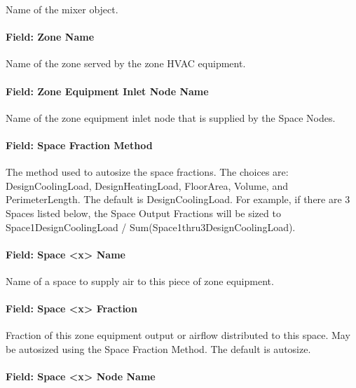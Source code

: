 Name of the mixer object.

\paragraph{Field: Zone Name}\label{field-seqmixer-zone-name}

Name of the zone served by the zone HVAC equipment.

\paragraph{Field: Zone Equipment Inlet Node Name}\label{field-seqmixer-zone-equipment-inlet-node-name}

Name of the zone equipment inlet node that is supplied by the Space Nodes.

\paragraph{Field: Space Fraction Method}\label{field-seqmixer-space-sizing-basis}

The method used to autosize the space fractions. The choices are: DesignCoolingLoad, DesignHeatingLoad, FloorArea, Volume, and PerimeterLength. The default is DesignCoolingLoad.
For example, if there are 3 Spaces listed below, the Space Output Fractions will be sized to Space1DesignCoolingLoad / Sum(Space1thru3DesignCoolingLoad).

\paragraph{Field: Space \textless{}x\textgreater{} Name}\label{field-seqmixer-space-name}

Name of a space to supply air to this piece of zone equipment.

\paragraph{Field: Space \textless{}x\textgreater{} Fraction}\label{field-seqmixer-space-output-fraction}

Fraction of this zone equipment output or airflow distributed to this space. May be autosized using the Space Fraction Method. The default is autosize.

\paragraph{Field: Space \textless{}x\textgreater{} Node Name}\label{field-seqmixer-space-node-name}

